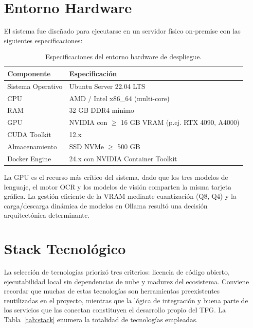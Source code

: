\section{Entorno Hardware}

El sistema fue diseñado para ejecutarse en un servidor físico on-premise con las siguientes especificaciones:

\begin{table}[H]
\centering
\caption{Especificaciones del entorno hardware de despliegue.}
\label{tab:hardware}
\begin{tabular}{ll}
\toprule
\textbf{Componente} & \textbf{Especificación} \\
\midrule
Sistema Operativo  & Ubuntu Server 22.04 LTS \\
CPU                & AMD / Intel x86\_64 (multi-core) \\
RAM                & 32 GB DDR4 mínimo \\
GPU                & NVIDIA con $\geq$ 16 GB VRAM (p.ej. RTX 4090, A4000) \\
CUDA Toolkit       & 12.x \\
Almacenamiento     & SSD NVMe $\geq$ 500 GB \\
Docker Engine      & 24.x con NVIDIA Container Toolkit \\
\bottomrule
\end{tabular}
\end{table}

La GPU es el recurso más crítico del sistema, dado que los tres modelos de lenguaje, el motor OCR y los modelos de visión comparten la misma tarjeta gráfica. La gestión eficiente de la VRAM mediante cuantización (Q8, Q4) y la carga/descarga dinámica de modelos en Ollama resultó una decisión arquitectónica determinante.

\section{Stack Tecnológico}

La selección de tecnologías priorizó tres criterios: licencia de código abierto, ejecutabilidad local sin dependencias de nube y madurez del ecosistema. Conviene recordar que muchas de estas tecnologías son herramientas preexistentes reutilizadas en el proyecto, mientras que la lógica de integración y buena parte de los servicios que las conectan constituyen el desarrollo propio del TFG. La Tabla~\ref{tab:stack} enumera la totalidad de tecnologías empleadas.

